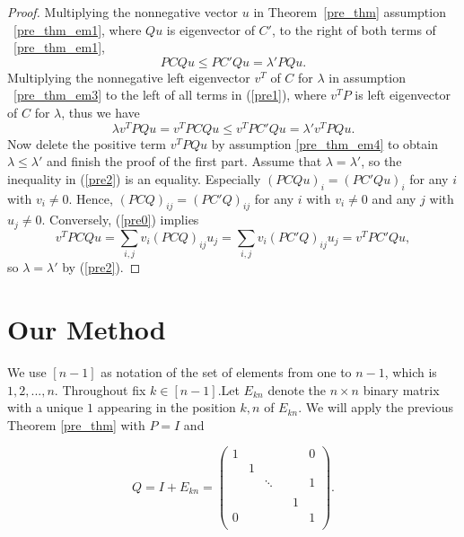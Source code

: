 \documentclass{article}
\theoremstyle{plain}
\theoremstyle{definition}
\begin{document}
\begin{proof}
    Multiplying the nonnegative vector $u$ in Theorem~\ref{pre_thm} assumption
    ~\ref{pre_thm_em1}, where $Qu$ is eigenvector of $C'$,  to the right of both terms of
    ~\ref{pre_thm_em1},    
    \begin{equation}\label{pre1}
       PCQu\leq PC'Qu=\lambda'PQu.
    \end{equation}
    Multiplying the nonnegative left eigenvector $v^T$ of $C$ for $\lambda$ in assumption
     ~\ref{pre_thm_em3} to the left of all terms  in (\ref{pre1}), where $v^TP$ is
    left eigenvector of $C$ for $\lambda$, thus we have
    \begin{equation}\label{pre2}
        \lambda v^TPQu=v^TPCQu\leq v^TPC'Qu=\lambda' v^TPQu.
    \end{equation}
        Now delete the positive term $v^TPQu$ by assumption \ref{pre_thm_em4} to obtain
        $\lambda\leq \lambda'$ and finish the proof of the first part.
        Assume that $\lambda=\lambda'$, so the inequality in (\ref{pre2}) is an equality.
        Especially $(PCQu)_i=(PC'Qu)_i$ for any $i$ with $v_i\not=0.$ Hence,
        $(PCQ)_{ij}=(PC'Q)_{ij}$ for any $i$ with $v_i\not=0$ and any $j$ with
        $u_j\not=0.$ Conversely, (\ref{pre0}) implies $$v^TPCQu=\sum_{i,j} v_i(PCQ)_{ij}u_j=
         \sum_{i,j} v_i(PC'Q)_{ij}u_j=v^TPC'Qu,$$ so $\lambda=\lambda'$ by (\ref{pre2}).
\end{proof}

\section{Our Method}
We use $[n-1]$ as notation of the set of elements from one to $n-1$, which is ${1,2,...,n}$.
Throughout fix $k\in [n-1]$.Let $E_{kn}$ denote the $n\times n$ binary matrix with a unique $1$ 
appearing in the position $k,n$ of $E_{kn}$. We will apply the previous Theorem \ref{pre_thm} with $P=I$ and 



\begin{equation} \label{Q_1}
Q=I+E_{kn}=\begin{pmatrix} 
1 &  & & &  & 0 \\
 & 1 &  &      &  &  \\
 &  & \ddots & &  & 1 \\
 &  &        & &  &  \\
  &  & & & 1 &  \\
0 &  & & &  & 1 \\
\end{pmatrix}.  
\end{equation}
\end{document}
